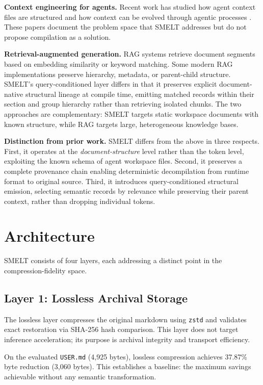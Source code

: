 \documentclass[11pt,a4paper]{article}
\begin{document}
\textbf{Context engineering for agents.} Recent work has studied how agent context files are structured \citep{agentreadmes2025, codifiedcontext2026} and how context can be evolved through agentic processes \citep{ace2026}. These papers document the problem space that SMELT addresses but do not propose compilation as a solution.

\textbf{Retrieval-augmented generation.} RAG systems retrieve document segments based on embedding similarity or keyword matching. Some modern RAG implementations preserve hierarchy, metadata, or parent-child structure. SMELT's query-conditioned layer differs in that it preserves explicit document-native structural lineage at compile time, emitting matched records within their section and group hierarchy rather than retrieving isolated chunks. The two approaches are complementary: SMELT targets static workspace documents with known structure, while RAG targets large, heterogeneous knowledge bases.

\textbf{Distinction from prior work.} SMELT differs from the above in three respects. First, it operates at the \textit{document-structure} level rather than the token level, exploiting the known schema of agent workspace files. Second, it preserves a complete provenance chain enabling deterministic decompilation from runtime format to original source. Third, it introduces query-conditioned structural emission, selecting semantic records by relevance while preserving their parent context, rather than dropping individual tokens.

\section{Architecture}

SMELT consists of four layers, each addressing a distinct point in the compression-fidelity space.

\subsection{Layer 1: Lossless Archival Storage}

The lossless layer compresses the original markdown using \texttt{zstd} and validates exact restoration via SHA-256 hash comparison. This layer does not target inference acceleration; its purpose is archival integrity and transport efficiency.

On the evaluated \texttt{USER.md} (4,925 bytes), lossless compression achieves 37.87\% byte reduction (3,060 bytes). This establishes a baseline: the maximum savings achievable without any semantic transformation.
\end{document}
